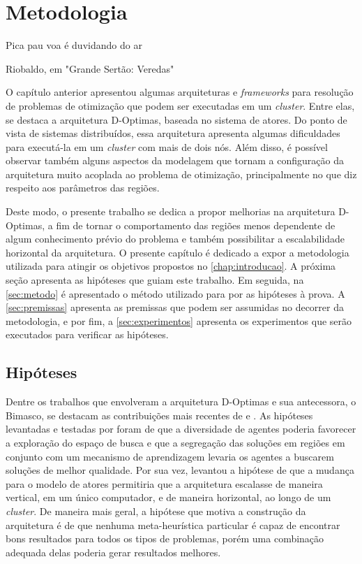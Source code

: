 \chapter{Metodologia}
\label{chap:metodologia}

\epigraph{Pica pau voa é duvidando do ar}{Riobaldo, em "Grande Sertão: Veredas"}


O capítulo anterior apresentou algumas arquiteturas e \textit{frameworks} para resolução de problemas de otimização que podem ser executadas em um \textit{cluster}. Entre elas, se destaca a arquitetura D-Optimas, baseada no sistema de atores. Do ponto de vista de sistemas distribuídos, essa arquitetura apresenta algumas dificuldades para executá-la em um \textit{cluster} com mais de dois nós. Além disso, é possível observar também alguns aspectos da modelagem que tornam a configuração da arquitetura muito acoplada ao problema de otimização, principalmente no que diz respeito aos parâmetros das regiões.

Deste modo, o presente trabalho se dedica a propor melhorias na arquitetura D-Optimas, a fim de tornar o comportamento das regiões menos dependente de algum conhecimento prévio do problema e também possibilitar a escalabilidade horizontal da arquitetura. O presente capítulo é dedicado a expor a metodologia utilizada para atingir os objetivos propostos no \autoref{chap:introducao}. A próxima seção apresenta as hipóteses que guiam este trabalho. Em seguida, na \autoref{sec:metodo} é apresentado o método utilizado para por as hipóteses à prova. A \autoref{sec:premissas} apresenta as premissas que podem ser assumidas no decorrer da metodologia, e por fim, a \autoref{sec:experimentos} apresenta os experimentos que serão executados para verificar as hipóteses.


\section{Hipóteses}
\label{sec:hipoteses}
Dentre os trabalhos que envolveram a arquitetura D-Optimas e sua antecessora, o Bimasco, se destacam as contribuições mais recentes de  e . As hipóteses levantadas e testadas por  foram de que a diversidade de agentes poderia favorecer a exploração do espaço de busca e que a segregação das soluções em regiões em conjunto com um mecanismo de aprendizagem levaria os agentes a buscarem soluções de melhor qualidade. Por sua vez,  levantou a hipótese de que a mudança para o modelo de atores permitiria que a arquitetura escalasse de maneira vertical, em um único computador, e de maneira horizontal, ao longo de um \textit{cluster}. De maneira mais geral, a hipótese que motiva a construção da arquitetura é de que nenhuma meta-heurística particular é capaz de encontrar bons resultados para todos os tipos de problemas, porém uma combinação adequada delas poderia gerar resultados melhores. 

